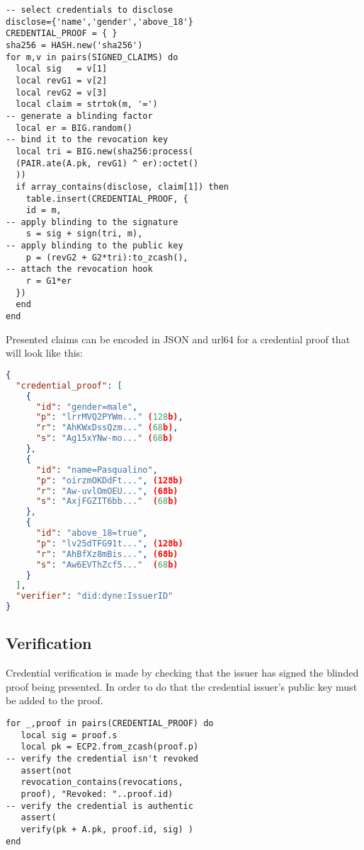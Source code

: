 \documentclass[conference]{IEEEtran}
\begin{document}
\begin{lstlisting}[style=lua,caption={Holder presents credentials}]
-- select credentials to disclose
disclose={'name','gender','above_18'}
CREDENTIAL_PROOF = { }
sha256 = HASH.new('sha256')
for m,v in pairs(SIGNED_CLAIMS) do
  local sig   = v[1]
  local revG1 = v[2]
  local revG2 = v[3]
  local claim = strtok(m, '=')
-- generate a blinding factor
  local er = BIG.random()
-- bind it to the revocation key
  local tri = BIG.new(sha256:process(
  (PAIR.ate(A.pk, revG1) ^ er):octet()
  ))
  if array_contains(disclose, claim[1]) then
	table.insert(CREDENTIAL_PROOF, {
    id = m,
-- apply blinding to the signature
    s = sig + sign(tri, m),
-- apply blinding to the public key
    p = (revG2 + G2*tri):to_zcash(),
-- attach the revocation hook
    r = G1*er
  })
  end
end
\end{lstlisting}

Presented claims can be encoded in JSON and url64 for a credential proof that will look like this:

\begin{lstlisting}[language=json,caption={Credential proof}]
{
  "credential_proof": [
    {
      "id": "gender=male",
      "p": "lrrMVQ2PYWm..." (128b),
      "r": "AhKWxDssQzm..." (68b),
      "s": "Ag15xYNw-mo..." (68b)
    },
    {
      "id": "name=Pasqualino",
      "p": "oirzmOKDdFt...", (128b)
      "r": "Aw-uvlOmOEU...", (68b)
      "s": "AxjFGZIT6bb..."  (68b)
    },
    {
      "id": "above_18=true",
      "p": "lv25dTFG91t...", (128b)
      "r": "AhBfXz8mBis...", (68b)
      "s": "Aw6EVThZcf5..."  (68b)
    }
  ],
  "verifier": "did:dyne:IssuerID"
}
\end{lstlisting}


\subsection{Verification}

Credential verification is made by checking that the issuer has signed the blinded proof being presented. In order to do that the credential issuer's public key must be added to the proof.

\begin{lstlisting}[style=lua,caption={Holder presents credentials}]
for _,proof in pairs(CREDENTIAL_PROOF) do
   local sig = proof.s
   local pk = ECP2.from_zcash(proof.p)
-- verify the credential isn't revoked
   assert(not
   revocation_contains(revocations,
   proof), "Revoked: "..proof.id)
-- verify the credential is authentic
   assert(
   verify(pk + A.pk, proof.id, sig) )
end
\end{lstlisting}
\end{document}
